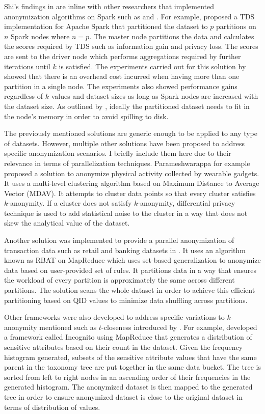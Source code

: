 \documentclass[11pt]{article}       %
\begin{document}
Shi's findings in \cite{Shi:2015} are inline with other researchers that implemented anonymization algorithms on Spark such as \cite{Canbay:2017} and \cite{Sopaoglu:2017}. For example, \cite{Sopaoglu:2017} proposed a TDS implementation for Apache Spark that partitioned the dataset to $p$ partitions on $n$ Spark nodes where \(n=p\). The master node partitions the data and calculates the scores required by TDS such as information gain and privacy loss. The scores are sent to the driver node which performs aggregations required by further iterations until $k$ is satisfied. The experiments carried out for this solution by \cite{Sopaoglu:2017} showed that there is an overhead cost incurred when having more than one partition in a single node. The experiments also showed performance gains regardless of $k$ values and dataset sizes as long as Spark nodes are increased with the dataset size. As outlined by \cite{Al-Zobbi-Mohammed:2018}, ideally the partitioned dataset needs to fit in the node's memory in order to avoid spilling to disk.

The previously mentioned solutions are generic enough to be applied to any type of datasets. However, multiple other solutions have been proposed to address specific anonymization scenarios. I briefly include them here due to their relevance in terms of parallelization techniques. Parameshwarappa \cite{Parameshwarappa:2019} for example proposed a solution to anonymize physical activity collected by wearable gadgets. It uses a multi-level clustering algorithm based on Maximum Distance to Average Vector (MDAV). It attempts to cluster data points so that every cluster satisfies $k$-anonymity. If a cluster does not satisfy $k$-anonymity, differential privacy technique is used to add statistical noise to the cluster in a way that does not skew the analytical value of the dataset. 

Another solution was implemented to provide a parallel anonymization of transaction data such as retail and banking datasets in \cite{Memon:2015}. It uses an algorithm known as RBAT on MapReduce which uses set-based generalization to anonymize data based on user-provided set of rules. It partitions data in a way that ensures the workload of every partition is approximately the same across different partitions. The solution scans the whole dataset in order to achieve this efficient partitioning based on QID values to minimize data shuffling across partitions.

Other frameworks were also developed to address specific variations to $k$-anonymity mentioned such as $t$-closeness introduced by \cite{Li-N.:2007}. For example, \cite{Chakravorty:2017} developed a framework called Incognito using MapReduce that generates a distribution of sensitive attributes based on their count in the dataset. Given the frequency histogram generated, subsets of the sensitive attribute values that have the same parent in the taxonomy tree are put together in the same data bucket. The tree is sorted from left to right nodes in an ascending order of their frequencies in the generated histogram. The anonymized dataset is then mapped to the generated tree in order to ensure anonymized dataset is close to the original dataset in terms of distribution of values.
\end{document}
